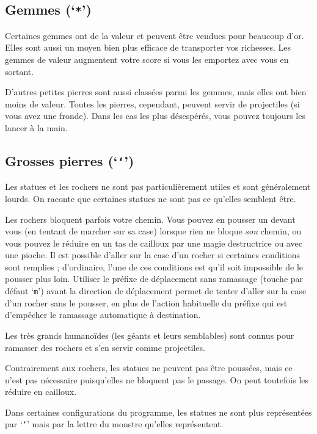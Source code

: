 \documentclass[titlepage]{article}
\begin{document}
\subsection*{Gemmes (`\texttt{*}')}

Certaines gemmes ont de la valeur et peuvent être vendues pour beaucoup d'or.
Elles sont aussi un moyen bien plus efficace de transporter vos richesses.
Les gemmes de valeur augmentent votre score si vous les emportez avec vous en sortant.

D'autres petites pierres sont aussi classées parmi les gemmes, mais elles ont bien
moins de valeur.
Toutes les pierres, cependant, peuvent servir de projectiles (si vous avez une fronde).
Dans les cas les plus désespérés, vous pouvez toujours les lancer à la main.

\subsection*{Grosses pierres (`\texttt{`}')}
Les statues et les rochers ne sont pas particulièrement utiles et sont généralement lourds.
On raconte que certaines statues ne sont pas ce qu'elles semblent être.

Les rochers bloquent parfois votre chemin.
Vous pouvez en pousser un devant vous (en tentant de marcher sur sa case)
lorsque rien ne bloque \textit{son} chemin, ou vous pouvez
le réduire en un tas de cailloux par une magie destructrice ou avec une pioche.
Il est possible d'aller sur la case d'un rocher si certaines conditions
sont remplies ; d'ordinaire, l'une de ces conditions est qu'il soit impossible
de le pousser plus loin.
Utiliser le préfixe de déplacement sans ramassage (touche par défaut `\texttt{m}')
avant la direction de déplacement permet de tenter d'aller sur la case d'un
rocher sans le pousser, en plus de l'action habituelle du préfixe qui est
d'empêcher le ramassage automatique à destination.

Les très grands humanoïdes (les géants et leurs semblables) sont connus pour ramasser
des rochers et s'en servir comme projectiles.

Contrairement aux rochers, les statues ne peuvent pas être poussées, mais ce n'est
pas nécessaire puisqu'elles ne bloquent pas le passage.
On peut toutefois les réduire en cailloux.

Dans certaines configurations du programme, les statues ne sont plus représentées
par `\texttt{`}'
mais par la lettre du monstre qu'elles représentent.
\end{document}
